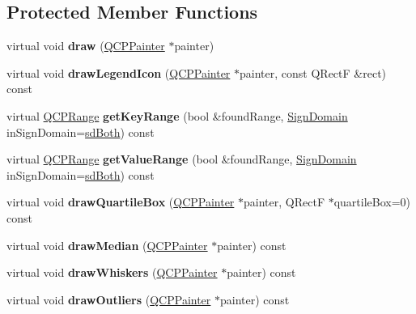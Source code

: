 \subsection*{Protected Member Functions}
\begin{DoxyCompactItemize}
\item 
\hypertarget{class_q_c_p_statistical_box_a753b62761217dd6b92f8a29e286a1317}{}\label{class_q_c_p_statistical_box_a753b62761217dd6b92f8a29e286a1317} 
virtual void {\bfseries draw} (\hyperlink{class_q_c_p_painter}{Q\+C\+P\+Painter} $\ast$painter)
\item 
\hypertarget{class_q_c_p_statistical_box_a41c6193fd24f5c1b6c754e7bcfe3e174}{}\label{class_q_c_p_statistical_box_a41c6193fd24f5c1b6c754e7bcfe3e174} 
virtual void {\bfseries draw\+Legend\+Icon} (\hyperlink{class_q_c_p_painter}{Q\+C\+P\+Painter} $\ast$painter, const Q\+RectF \&rect) const
\item 
\hypertarget{class_q_c_p_statistical_box_ac17d9d68e41be25b7f0e8a47f9a5d225}{}\label{class_q_c_p_statistical_box_ac17d9d68e41be25b7f0e8a47f9a5d225} 
virtual \hyperlink{class_q_c_p_range}{Q\+C\+P\+Range} {\bfseries get\+Key\+Range} (bool \&found\+Range, \hyperlink{class_q_c_p_abstract_plottable_a661743478a1d3c09d28ec2711d7653d8}{Sign\+Domain} in\+Sign\+Domain=\hyperlink{class_q_c_p_abstract_plottable_a661743478a1d3c09d28ec2711d7653d8a082b98cfb91a7363a3b5cd17b0c1cd60}{sd\+Both}) const
\item 
\hypertarget{class_q_c_p_statistical_box_a13958798713d4bb58b94e148b409877d}{}\label{class_q_c_p_statistical_box_a13958798713d4bb58b94e148b409877d} 
virtual \hyperlink{class_q_c_p_range}{Q\+C\+P\+Range} {\bfseries get\+Value\+Range} (bool \&found\+Range, \hyperlink{class_q_c_p_abstract_plottable_a661743478a1d3c09d28ec2711d7653d8}{Sign\+Domain} in\+Sign\+Domain=\hyperlink{class_q_c_p_abstract_plottable_a661743478a1d3c09d28ec2711d7653d8a082b98cfb91a7363a3b5cd17b0c1cd60}{sd\+Both}) const
\item 
\hypertarget{class_q_c_p_statistical_box_a699ede353d6a7207d9fb36dd3aabf348}{}\label{class_q_c_p_statistical_box_a699ede353d6a7207d9fb36dd3aabf348} 
virtual void {\bfseries draw\+Quartile\+Box} (\hyperlink{class_q_c_p_painter}{Q\+C\+P\+Painter} $\ast$painter, Q\+RectF $\ast$quartile\+Box=0) const
\item 
\hypertarget{class_q_c_p_statistical_box_a642b90dd4ab5ab6e16188a9230401bcc}{}\label{class_q_c_p_statistical_box_a642b90dd4ab5ab6e16188a9230401bcc} 
virtual void {\bfseries draw\+Median} (\hyperlink{class_q_c_p_painter}{Q\+C\+P\+Painter} $\ast$painter) const
\item 
\hypertarget{class_q_c_p_statistical_box_ae64401aa18b9c45d4d33f9b46cf4bbd0}{}\label{class_q_c_p_statistical_box_ae64401aa18b9c45d4d33f9b46cf4bbd0} 
virtual void {\bfseries draw\+Whiskers} (\hyperlink{class_q_c_p_painter}{Q\+C\+P\+Painter} $\ast$painter) const
\item 
\hypertarget{class_q_c_p_statistical_box_a8550e16af27b4e05d92bb337fb34324f}{}\label{class_q_c_p_statistical_box_a8550e16af27b4e05d92bb337fb34324f} 
virtual void {\bfseries draw\+Outliers} (\hyperlink{class_q_c_p_painter}{Q\+C\+P\+Painter} $\ast$painter) const
\end{DoxyCompactItemize}
